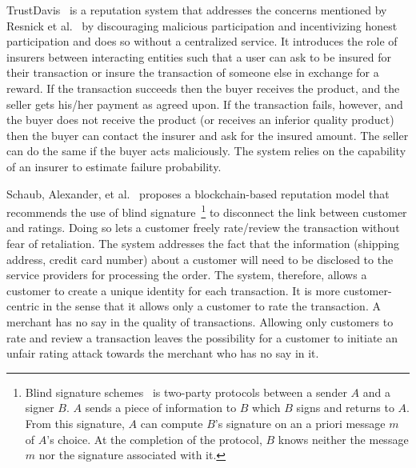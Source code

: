 TrustDavis~\cite{defigueiredo2005trustdavis} is a reputation system that
addresses the concerns mentioned by Resnick et al.~\cite{resnick2002trust} by
discouraging malicious participation and incentivizing honest participation and
does so without a centralized service. It introduces the role of insurers
between interacting entities such that a user can ask to be insured for their
transaction or insure the transaction of someone else in exchange for a reward.
If the transaction succeeds then the buyer receives the product, and the seller
gets his/her payment as agreed upon. If the transaction fails, however, and the
buyer does not receive the product (or receives an inferior quality product)
then the buyer can contact the insurer and ask for the insured amount. The
seller can do the same if the buyer acts maliciously. The system relies on the
capability of an insurer to estimate failure probability. \par
Schaub, Alexander, et al.~\cite{schaub2016trustless} proposes a
blockchain-based reputation model that recommends the use of blind
signature~\footnote{Blind signature schemes~\cite{katz1996handbook} is
two-party protocols between a sender $A$ and a signer $B$. $A$ sends a piece of
information to $B$ which $B$ signs and returns to $A$. From this signature, $A$
can compute $B$'s signature on an a priori message $m$ of $A$'s choice. At the
completion of the protocol, $B$ knows neither the message $m$ nor the signature
associated with it.} to disconnect the link between customer and ratings. Doing
so lets a customer freely rate/review the transaction without fear of
retaliation. The system addresses the fact that the information (shipping
address, credit card number) about a customer will need to be disclosed to the
service providers for processing the order. The system, therefore, allows a
customer to create a unique identity for each transaction. It is more
customer-centric in the sense that it allows only a customer to rate the
transaction. A merchant has no say in the quality of transactions. Allowing
only customers to rate and review a transaction leaves the possibility for a
customer to initiate an unfair rating attack towards the merchant who has no
say in it.\par

